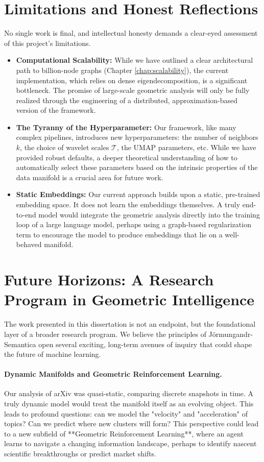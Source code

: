 \section{Limitations and Honest Reflections}
No single work is final, and intellectual honesty demands a clear-eyed assessment of this project's limitations.
\begin{itemize}
    \item \textbf{Computational Scalability:} While we have outlined a clear architectural path to billion-node graphs (Chapter \ref{chap:scalability}), the current implementation, which relies on dense eigendecomposition, is a significant bottleneck. The promise of large-scale geometric analysis will only be fully realized through the engineering of a distributed, approximation-based version of the framework.
    \item \textbf{The Tyranny of the Hyperparameter:} Our framework, like many complex pipelines, introduces new hyperparameters: the number of neighbors $k$, the choice of wavelet scales $\mathcal{T}$, the UMAP parameters, etc. While we have provided robust defaults, a deeper theoretical understanding of how to automatically select these parameters based on the intrinsic properties of the data manifold is a crucial area for future work.
    \item \textbf{Static Embeddings:} Our current approach builds upon a static, pre-trained embedding space. It does not learn the embeddings themselves. A truly end-to-end model would integrate the geometric analysis directly into the training loop of a large language model, perhaps using a graph-based regularization term to encourage the model to produce embeddings that lie on a well-behaved manifold.
\end{itemize}

\section{Future Horizons: A Research Program in Geometric Intelligence}
The work presented in this dissertation is not an endpoint, but the foundational layer of a broader research program. We believe the principles of Jörmungandr-Semantica open several exciting, long-term avenues of inquiry that could shape the future of machine learning.

\paragraph{Dynamic Manifolds and Geometric Reinforcement Learning.} Our analysis of arXiv was quasi-static, comparing discrete snapshots in time. A truly dynamic model would treat the manifold itself as an evolving object. This leads to profound questions: can we model the "velocity" and "acceleration" of topics? Can we predict where new clusters will form? This perspective could lead to a new subfield of **Geometric Reinforcement Learning**, where an agent learns to navigate a changing information landscape, perhaps to identify nascent scientific breakthroughs or predict market shifts.

